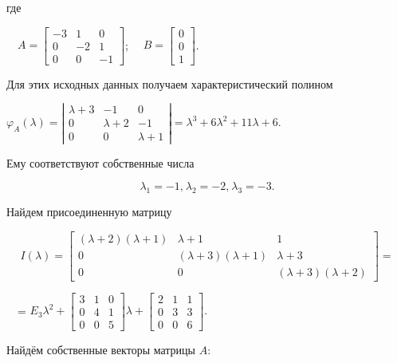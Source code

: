 		где



		\ \  $A=\left[\begin{matrix}-3&1&0\\0&-2&1\\0&0&-1\end{matrix}\right]$; \ \ 
		$B=\left[\begin{matrix}0\\0\\1\end{matrix}\right]$.



		Для этих исходных данных получаем характеристический полином



		$\varphi _A(\lambda )=|\begin{matrix}\lambda +3&-1&0\\0&\lambda +2&-1\\0&0&\lambda +1\end{matrix}|=\lambda ^3+6\lambda ^2+11\lambda +6$.



		Ему соответствуют собственные числа


\begin{equation*}
\lambda _1=-1,^{}\lambda _2=-2,^{}\lambda _3=-3.
\end{equation*}

		Найдем присоединенную матрицу


\begin{equation*}
I(\lambda )=\left[\begin{matrix}(\lambda +2)(\lambda +1)&\lambda +1&1\\0&(\lambda +3)(\lambda +1)&\lambda +3\\0&0&(\lambda +3)(\lambda +2)\end{matrix}\right]=
\end{equation*}

		\ \ =
		$E_3\lambda ^2+\left[\begin{matrix}3&1&0\\0&4&1\\0&0&5\end{matrix}\right]\lambda +\left[\begin{matrix}2&1&1\\0&3&3\\0&0&6\end{matrix}\right].$



		Найдём собственные векторы матрицы  $A$:


